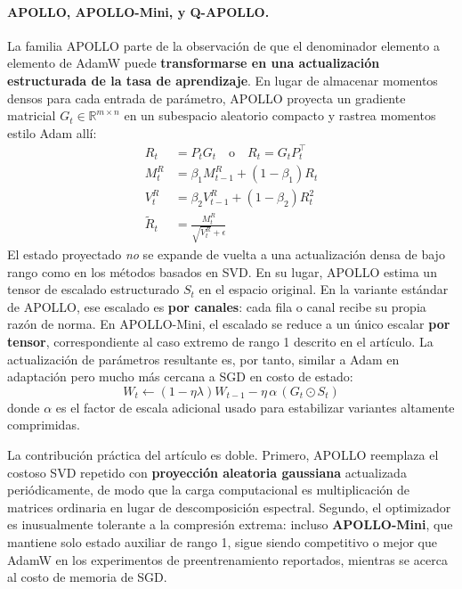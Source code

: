 \paragraph{APOLLO, APOLLO-Mini, y Q-APOLLO.}
La familia APOLLO \citep{zhu2025apollosgdlikememoryadamwlevel} parte de la observación de que el denominador elemento a elemento de AdamW puede \textbf{transformarse en una actualización estructurada de la tasa de aprendizaje}. En lugar de almacenar momentos densos para cada entrada de parámetro, APOLLO proyecta un gradiente matricial $G_t \in \mathbb{R}^{m \times n}$ en un subespacio aleatorio compacto y rastrea momentos estilo Adam allí:
\begin{align}
R_t &= P_t G_t \quad\text{o}\quad R_t = G_t P_t^\top \\
M_t^R &= \beta_1 M_{t-1}^R + (1-\beta_1)R_t \\
V_t^R &= \beta_2 V_{t-1}^R + (1-\beta_2)R_t^2 \\
\widetilde{R}_t &= \frac{M_t^R}{\sqrt{V_t^R}+\epsilon}
\end{align}
El estado proyectado \emph{no} se expande de vuelta a una actualización densa de bajo rango como en los métodos basados en SVD. En su lugar, APOLLO estima un tensor de escalado estructurado $S_t$ en el espacio original. En la variante estándar de APOLLO, ese escalado es \textbf{por canales}: cada fila o canal recibe su propia razón de norma. En APOLLO-Mini, el escalado se reduce a un único escalar \textbf{por tensor}, correspondiente al caso extremo de rango 1 descrito en el artículo. La actualización de parámetros resultante es, por tanto, similar a Adam en adaptación pero mucho más cercana a SGD en costo de estado:
\[
W_t \gets (1-\eta\lambda)W_{t-1} - \eta\,\alpha\,(G_t \odot S_t)
\]
donde $\alpha$ es el factor de escala adicional usado para estabilizar variantes altamente comprimidas.

La contribución práctica del artículo es doble. Primero, APOLLO reemplaza el costoso SVD repetido con \textbf{proyección aleatoria gaussiana} actualizada periódicamente, de modo que la carga computacional es multiplicación de matrices ordinaria en lugar de descomposición espectral. Segundo, el optimizador es inusualmente tolerante a la compresión extrema: incluso \textbf{APOLLO-Mini}, que mantiene solo estado auxiliar de rango 1, sigue siendo competitivo o mejor que AdamW en los experimentos de preentrenamiento reportados, mientras se acerca al costo de memoria de SGD.

